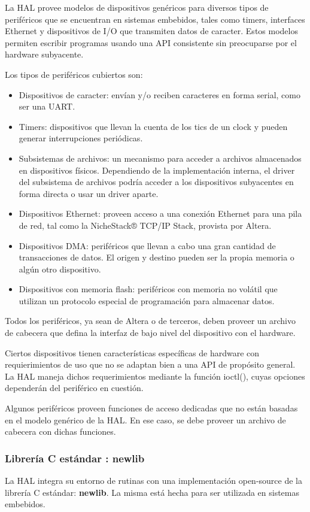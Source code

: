La HAL provee modelos de dispositivos genéricos para diversos tipos de periféricos que se encuentran en sistemas embebidos, tales como timers, interfaces Ethernet y dispositivos de I/O que transmiten datos de caracter. Estos modelos permiten escribir programas usando una API consistente sin preocuparse por el hardware subyacente.

Los tipos de periféricos cubiertos son:

\begin{itemize}
	\item Dispositivos de caracter: envían y/o reciben caracteres en forma serial, como ser una UART.
	\item Timers: dispositivos que llevan la cuenta de los tics de un clock y pueden generar interrupciones periódicas.
	\item Subsistemas de archivos: un mecanismo para acceder a archivos almacenados en dispositivos físicos. Dependiendo de la implementación interna, el driver del subsistema de archivos podría acceder a los dispositivos subyacentes en forma directa o usar un driver aparte.
	\item Dispositivos Ethernet: proveen acceso a una conexión Ethernet para una pila de red, tal como la NicheStack® TCP/IP Stack, provista por Altera.
	\item Dispositivos DMA: periféricos que llevan a cabo una gran cantidad de transacciones de datos. El origen y destino pueden ser la propia memoria o algún otro dispositivo.
	\item Dispositivos con memoria flash: periféricos con memoria no volátil que utilizan un protocolo especial de programación para almacenar datos.
\end{itemize}

Todos los periféricos, ya sean de Altera o de terceros, deben proveer un archivo de cabecera que defina la interfaz de bajo nivel del dispositivo con el hardware. 

Ciertos dispositivos tienen características específicas de hardware con requierimientos de uso que no se adaptan bien a una API de propósito general. La HAL maneja dichos requerimientos mediante la función ioctl(), cuyas opciones dependerán del periférico en cuestión.

Algunos periféricos proveen funciones de acceso dedicadas que no están basadas en el modelo genérico de la HAL. En ese caso, se debe proveer un archivo de cabecera con dichas funciones.


\subsubsection{Librería C estándar : newlib}
La HAL integra su entorno de rutinas con una implementación open-source de la librería C estándar:\textbf{ newlib}. La misma está hecha para ser utilizada en sistemas embebidos. 


